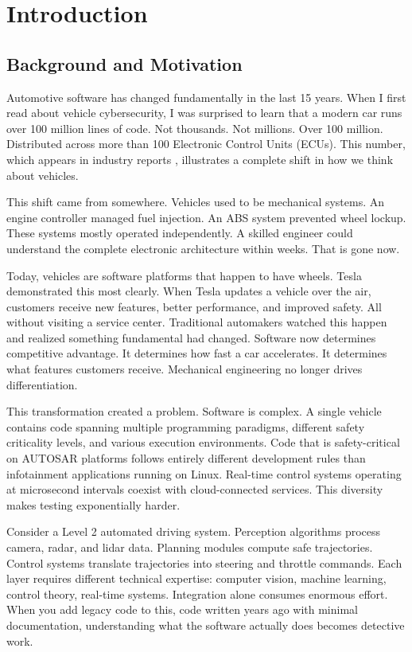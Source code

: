 
\chapter{Introduction}
\label{chap:introduction}

\section{Background and Motivation}
\label{sec:background_motivation}

Automotive software has changed fundamentally in the last 15 years. When I first read about vehicle cybersecurity, I was surprised to learn that a modern car runs over 100 million lines of code. Not thousands. Not millions. Over 100 million. Distributed across more than 100 Electronic Control Units (ECUs). This number, which appears in industry reports \cite{Charette2009, Broy2006}, illustrates a complete shift in how we think about vehicles.

This shift came from somewhere. Vehicles used to be mechanical systems. An engine controller managed fuel injection. An ABS system prevented wheel lockup. These systems mostly operated independently. A skilled engineer could understand the complete electronic architecture within weeks. That is gone now.

Today, vehicles are software platforms that happen to have wheels. Tesla demonstrated this most clearly. When Tesla updates a vehicle over the air, customers receive new features, better performance, and improved safety. All without visiting a service center. Traditional automakers watched this happen and realized something fundamental had changed. Software now determines competitive advantage. It determines how fast a car accelerates. It determines what features customers receive. Mechanical engineering no longer drives differentiation.

This transformation created a problem. Software is complex. A single vehicle contains code spanning multiple programming paradigms, different safety criticality levels, and various execution environments. Code that is safety-critical on AUTOSAR platforms follows entirely different development rules than infotainment applications running on Linux. Real-time control systems operating at microsecond intervals coexist with cloud-connected services. This diversity makes testing exponentially harder.

Consider a Level 2 automated driving system. Perception algorithms process camera, radar, and lidar data. Planning modules compute safe trajectories. Control systems translate trajectories into steering and throttle commands. Each layer requires different technical expertise: computer vision, machine learning, control theory, real-time systems. Integration alone consumes enormous effort. When you add legacy code to this, code written years ago with minimal documentation, understanding what the software actually does becomes detective work.


